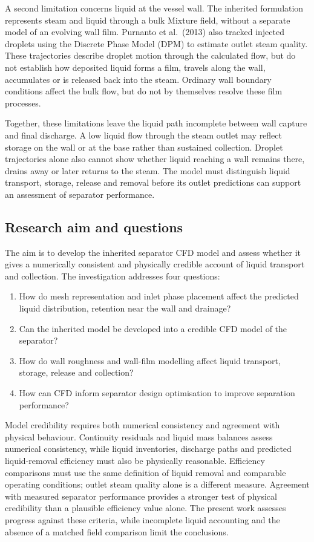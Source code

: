 \documentclass[12pt]{article}
\begin{document}
A second limitation concerns liquid at the vessel wall. The inherited formulation represents steam and liquid through a bulk Mixture field, without a separate model of an evolving wall film. Purnanto et al.~(2013) also tracked injected droplets using the Discrete Phase Model (DPM) to estimate outlet steam quality. These trajectories describe droplet motion through the calculated flow, but do not establish how deposited liquid forms a film, travels along the wall, accumulates or is released back into the steam. Ordinary wall boundary conditions affect the bulk flow, but do not by themselves resolve these film processes.

Together, these limitations leave the liquid path incomplete between wall capture and final discharge. A low liquid flow through the steam outlet may reflect storage on the wall or at the base rather than sustained collection. Droplet trajectories alone also cannot show whether liquid reaching a wall remains there, drains away or later returns to the steam. The model must distinguish liquid transport, storage, release and removal before its outlet predictions can support an assessment of separator performance.

\subsection{Research aim and questions}\label{research-aim-and-questions}

The aim is to develop the inherited separator CFD model and assess whether it gives a numerically consistent and physically credible account of liquid transport and collection. The investigation addresses four questions:

\begin{enumerate}
\def\labelenumi{\arabic{enumi}.}
\item
  How do mesh representation and inlet phase placement affect the predicted liquid distribution, retention near the wall and drainage?
\item
  Can the inherited model be developed into a credible CFD model of the separator?
\item
  How do wall roughness and wall-film modelling affect liquid transport, storage, release and collection?
\item
  How can CFD inform separator design optimisation to improve separation performance?
\end{enumerate}

Model credibility requires both numerical consistency and agreement with physical behaviour. Continuity residuals and liquid mass balances assess numerical consistency, while liquid inventories, discharge paths and predicted liquid-removal efficiency must also be physically reasonable. Efficiency comparisons must use the same definition of liquid removal and comparable operating conditions; outlet steam quality alone is a different measure. Agreement with measured separator performance provides a stronger test of physical credibility than a plausible efficiency value alone. The present work assesses progress against these criteria, while incomplete liquid accounting and the absence of a matched field comparison limit the conclusions.
\end{document}
